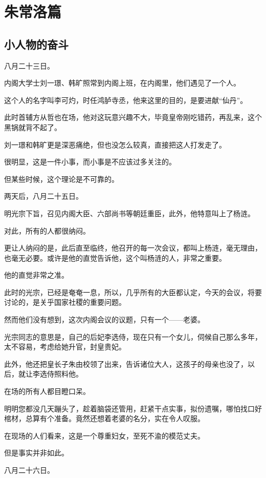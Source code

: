 \chapter*{朱常洛篇}
\section{小人物的奋斗}
\ifnum{}
	\begin{multicols}{\theparacolNo}
\fi
八月二十三日。

内阁大学士刘一璟、韩旷照常到内阁上班，在内阁里，他们遇见了一个人。

这个人的名字叫李可灼，时任鸿胪寺丞，他来这里的目的，是要进献“仙丹”。

此时首辅方从哲也在场，他对这玩意兴趣不大，毕竟皇帝刚吃错药，再乱来，这个黑锅就背不起了。

刘一璟和韩旷更是深恶痛绝，但也没怎么较真，直接把这人打发走了。

很明显，这是一件小事，而小事是不应该过多关注的。

但某些时候，这个理论是不可靠的。

两天后，八月二十五日。

明光宗下旨，召见内阁大臣、六部尚书等朝廷重臣，此外，他特意叫上了杨涟。

对此，所有的人都很纳闷。

更让人纳闷的是，此后直至临终，他召开的每一次会议，都叫上杨涟，毫无理由，也毫无必要。或许是他的直觉告诉他，这个叫杨涟的人，非常之重要。

他的直觉非常之准。

此时的光宗，已经是奄奄一息，所以，几乎所有的大臣都认定，今天的会议，将要讨论的，是关乎国家社稷的重要问题。

然而他们没有想到，这次内阁会议的议题，只有一个——老婆。

光宗同志的意思是，自己的后妃李选侍，现在只有一个女儿，伺候自己那么多年，太不容易，考虑给她升官，封皇贵妃。

此外，他还把皇长子朱由校领了出来，告诉诸位大人，这孩子的母亲也没了，以后，就让李选侍照料他。

在场的所有人都目瞪口呆。

明明您都没几天蹦头了，趁着脑袋还管用，赶紧干点实事，拟份遗嘱，哪怕找口好棺材，总算有个准备。竟然还想着老婆的名分，实在令人叹服。

在现场的人们看来，这是一个尊重妇女，至死不渝的模范丈夫。

但是事实并非如此。

八月二十六日。


\end{multicols}
